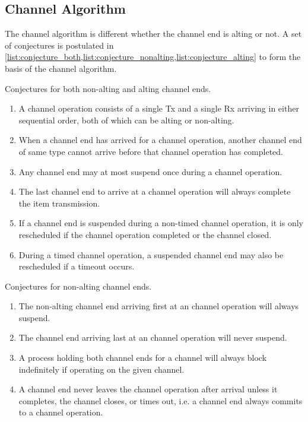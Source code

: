\FloatBarrier
\subsection{Channel Algorithm}
\label{subsec:channel_algorithm}

The channel algorithm is different whether the channel end is alting or not. A set of conjectures is postulated in \cref{list:conjecture_both,list:conjecture_nonalting,list:conjecture_alting} to form the basis of the channel algorithm.

\FloatBarrier

\begin{enumeratefloat}
    \caption{Conjectures for both non\hyp{}alting and alting channel ends.}
    \label{list:conjecture_both}
    \begin{enumerate}[topsep=0em,itemsep=-1em,partopsep=0.5em,parsep=1em]
        \item A channel operation consists of a single Tx and a single Rx arriving in either sequential order, both of which can be alting or non\hyp{}alting.
        \item When a channel end has arrived for a channel operation, another channel end of same type cannot arrive before that channel operation has completed.
        \item Any channel end may at most suspend once during a channel operation.
        \item The last channel end to arrive at a channel operation will always complete the item transmission.
        \item If a channel end is suspended during a non\hyp{}timed channel operation, it is only rescheduled if the channel operation completed or the channel closed.
        \item During a timed channel operation, a suspended channel end may also be rescheduled if a timeout occurs.
    \end{enumerate}
\end{enumeratefloat}

\begin{enumeratefloat}
    \caption{Conjectures for non\hyp{}alting channel ends.}
    \label{list:conjecture_nonalting}
    \begin{enumerate}[topsep=0em,itemsep=-1em,partopsep=0.5em,parsep=1em]
        \item The non\hyp{}alting channel end arriving first at an channel operation will always suspend.
        \item The channel end arriving last at an channel operation will never suspend.
        \item A process holding both channel ends for a channel will always block indefinitely if operating on the given channel.
        \item A channel end never leaves the channel operation after arrival unless it completes, the channel closes, or times out, i.e. a channel end always commits to a channel operation.
    \end{enumerate}
\end{enumeratefloat}

